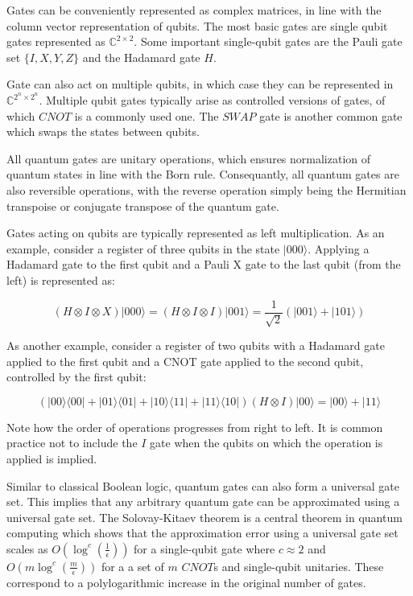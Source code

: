 \documentclass{article}
\begin{document}
Gates can be conveniently represented as complex matrices, in line with the column vector representation of qubits. The most basic gates are single qubit gates represented as $\mathbb{C}^{2\times2}$. Some important single-qubit gates are  the Pauli gate set $\{I,X,Y,Z\}$ and the Hadamard gate $H$.

Gate can also act on multiple qubits, in which case they can be represented in $\mathbb{C}^{2^{n}\times2^{n}}$. Multiple qubit gates typically arise as controlled versions of gates, of which $CNOT$ is a commonly used one. The $SWAP$ gate is another common gate which swaps the states between qubits.

All quantum gates are unitary operations, which ensures normalization of quantum states in line with the Born rule. Consequantly, all quantum gates are also reversible operations, with the reverse operation simply being the Hermitian transpoise or conjugate transpose of the quantum gate.

Gates acting on qubits are typically represented as left multiplication. As an example, consider a register of three qubits in the state $ \lvert 000 \rangle $. Applying a Hadamard gate to the first qubit and a Pauli X gate to the last qubit (from the left) is represented as:

\begin{equation}
(H\otimes I\otimes X) \lvert 000 \rangle = (H \otimes I \otimes I) \lvert 001 \rangle = \frac{1}{\sqrt{2}} (\lvert 001 \rangle + \lvert 101 \rangle)
\end{equation}

As another example, consider a  register of two qubits with a Hadamard gate applied to the first qubit and a CNOT gate applied to the second qubit, controlled by the first qubit:

\begin{equation}
( \lvert 00 \rangle \langle 00 \rvert + 
\lvert 01 \rangle \langle 01 \rvert + 
\lvert 10 \rangle \langle 11 \rvert + 
\lvert 11 \rangle \langle 10 \rvert
 )(H \otimes I) \lvert 00 \rangle 
=
\lvert 00 \rangle + \lvert 11 \rangle 
\end{equation}

Note how the order of operations progresses from right to left. It is common practice not to include the $I$ gate when the qubits on which the operation is applied is implied.

Similar to classical Boolean logic, quantum gates can also form a universal gate set. This implies that any arbitrary quantum gate can be approximated using a universal gate set. The Solovay-Kitaev theorem is a central theorem in quantum computing which shows that the approximation error using a universal gate set scales as $ O (\log^c (\frac{1}{\epsilon}))$ for a single-qubit gate where $ c \approx 2$ and $O(m \log ^c (\frac{m}{\epsilon}))$ for a a set of $m$ $CNOT$s  and single-qubit unitaries. These correspond to a polylogarithmic increase in the original number of gates.
\end{document}
